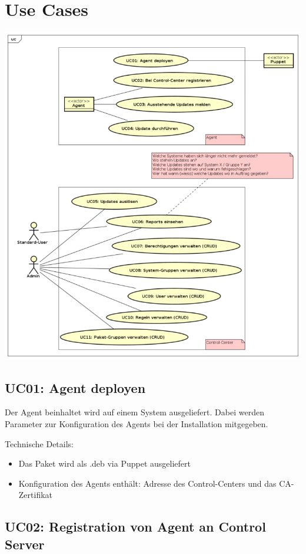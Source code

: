\section{Use Cases}

\includegraphics[width=\textwidth]{files/UseCases_small}

\xxx[finish]

\subsection*{UC01: Agent deployen}
\label{sec:uc_01}

Der Agent beinhaltet wird auf einem System ausgeliefert. Dabei werden Parameter zur Konfiguration des Agents bei der Installation mitgegeben.


Technische Details:

\begin{itemize}
    \item Das Paket wird als .deb via Puppet ausgeliefert
    \item Konfiguration des Agents enthält: Adresse des Control-Centers und das CA-Zertifikat
\end{itemize}


\subsection*{UC02: Registration von Agent an Control Server}
\label{sec:uc_02}

